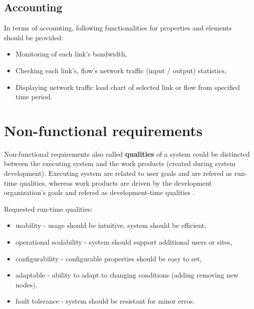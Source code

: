 \documentclass[11pt]{book}
\begin{document}
      \subsection{Accounting}  %
		\label{sec:req:func:acc}
		
		In terms of accounting, following functionalities for properties and elements should be provided:
		
		\begin{itemize}
			\item{Monitoring of each link's bandwidth, }
			\item{Checking each link's, flow's network traffic (input / output) statistics, }
			\item{Displaying network traffic load chart of selected link or flow from specified time period. }
		\end{itemize}

    \section{Non-functional requirements}
		\label{sec:req:nonfunc}

	
		Non-functional requirements also called \textbf{qualities} of a system could be distincted between 
		the executing system and the work products (created during system development). Executing system are related
		to user goals and are refered as run-time qualities, whereas work products are driven by the development organization’s
		goals and refered as development-time qualities \cite{nonfunctional}. 

                \medskip
		
		Requested run-time qualities:
		\begin{itemize}
			\item{usability - usage should be intuitive, system should be efficient,}
			\item{operational scalability - system should support additional users or sites, }
			\item{configurability - configurable properties should be easy to set,}
			\item{adaptable - ability to adapt to changing conditions (adding removing new nodes),}
			\item{fault tolerance - system should be resistant for minor erros.}
		\end{itemize}
		
\end{document}

